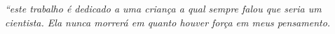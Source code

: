 \begin{epigrafe}
	\vspace*{\fill}
	\begin{flushright}
		\textit{``este trabalho é dedicado a uma criança a qual sempre falou que seria um cientista. Ela nunca morrerá em quanto houver força em meus pensamento.}
	\end{flushright}
\end{epigrafe}
